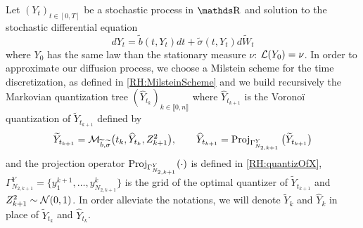 Let $(Y_t)_{t \in [0,T]}$ be a stochastic process in $\R$ and solution to the stochastic differential equation
\begin{equation}
	d Y_t = \widetilde b (t, Y_t) dt + \widetilde \sigma (t, Y_t) d \widetilde W_t
\end{equation}
where $Y_0$ has the same law than the stationary measure $\nu$: $\operatorname{\mathcal{L}} (Y_0) = \nu$. In order to approximate our diffusion process, we choose a Milstein scheme for the time discretization, as defined in \ref{RH:MilsteinScheme} and we build recursively the Markovian quantization tree $(\widehat Y_{t_k})_{k \in \llbracket 0, n \rrbracket}$ where $\widehat Y_{t_{k+1}}$ is the Vorono\"i quantization of $\widetilde Y_{t_{k+1}}$ defined by
\begin{equation} \label{RH:recurQuantiVol}
	\widetilde Y_{t_{k+1}} = \mathcal{M}_{\widetilde b, \widetilde \sigma} \big( t_k, \widehat Y_{t_k}, Z_{k+1}^2 \big), \qquad \widehat Y_{t_{k+1}} = \operatorname{\mathrm{Proj}}_{\Gamma_{N_{2,k+1}}^Y} \big( \widetilde{Y}_{t_{k+1}} \big)
\end{equation}
and the projection operator $\operatorname{\mathrm{Proj}}_{\Gamma_{N_{2,k+1}}^Y}(\cdot)$ is defined in \eqref{RH:quantizOfX}, $\Gamma_{N_{2,k+1}}^Y = \big\{ y_1^{k+1}, \dots, y_{N_{2,k+1}}^k \big\}$ is the grid of the optimal quantizer of $\widetilde{Y}_{t_{k+1}}$ and $Z_{k+1}^2 \sim \operatorname{\mathcal{N}}(0,1)$. In order alleviate the notations, we will denote $\widetilde Y_k$ and $\widehat Y_k$ in place of $\widetilde Y_{t_k}$ and $\widehat Y_{t_k}$.

